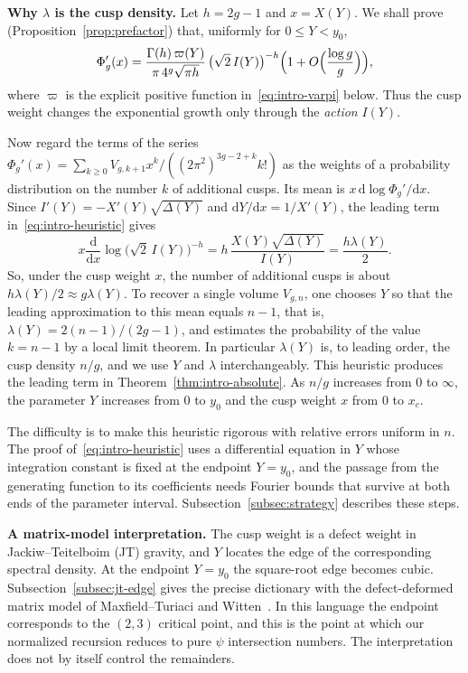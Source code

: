 \textbf{Why $\lambda$ is the cusp density.} Let $h=2g-1$ and $x=X(Y)$. We shall prove (Proposition~\ref{prop:prefactor}) that, uniformly for $0\le Y<y_0$,
\begin{equation}
 \Phi_g'(x)=\frac{\Gamma(h)\,\varpi(Y)}{\pi\,4^g\sqrt{\pi h}}\,
 \bigl(\sqrt2\,I(Y)\bigr)^{-h}\Bigl(1+O\Bigl(\frac{\log g}{g}\Bigr)\Bigr),
 \label{eq:intro-heuristic}
\end{equation}
where $\varpi$ is the explicit positive function in~\eqref{eq:intro-varpi} below. Thus the cusp weight changes the exponential growth only through the \emph{action} $I(Y)$.

Now regard the terms of the series
$\Phi_g'(x)=\sum_{k\ge0}V_{g,k+1}x^k/((2\pi^2)^{3g-2+k}k!)$ as the weights of a
probability distribution on the number $k$ of additional cusps. Its mean is
$x\,\mathrm d\log\Phi_g'/\mathrm dx$. Since $I'(Y)=-X'(Y)\sqrt{\Delta(Y)}$ and
$\mathrm dY/\mathrm dx=1/X'(Y)$, the leading term in~\eqref{eq:intro-heuristic} gives
\[
 x\frac{\mathrm d}{\mathrm dx}\log\bigl(\sqrt2\,I(Y)\bigr)^{-h}
 =h\,\frac{X(Y)\sqrt{\Delta(Y)}}{I(Y)}=\frac{h\lambda(Y)}2 .
\]
So, under the cusp weight $x$, the number of additional cusps is about
$h\lambda(Y)/2\approx g\lambda(Y)$. To recover a single volume $V_{g,n}$, one
chooses $Y$ so that the leading approximation to this mean equals $n-1$, that is,
$\lambda(Y)=2(n-1)/(2g-1)$, and estimates the probability of the value
$k=n-1$ by a local limit theorem. In particular $\lambda(Y)$ is, to leading
order, the cusp density $n/g$, and we use $Y$ and $\lambda$
interchangeably. This heuristic produces the leading term in
Theorem~\ref{thm:intro-absolute}. As $n/g$ increases from $0$ to $\infty$,
the parameter $Y$ increases from $0$ to $y_0$ and the cusp weight $x$ from
$0$ to $x_c$.

The difficulty is to make this heuristic rigorous with relative errors uniform in $n$. The proof of~\eqref{eq:intro-heuristic} uses a differential equation in $Y$ whose integration constant is fixed at the endpoint $Y=y_0$, and the passage from the generating function to its coefficients needs Fourier bounds that survive at both ends of the parameter interval. Subsection~\ref{subsec:strategy} describes these steps.

\textbf{A matrix-model interpretation.} The cusp weight is a defect weight in Jackiw--Teitelboim (JT) gravity, and $Y$ locates the edge of the corresponding spectral density. At the endpoint $Y=y_0$ the square-root edge becomes cubic. Subsection~\ref{subsec:jt-edge} gives the precise dictionary with the defect-deformed matrix model of Maxfield--Turiaci and Witten~\cite{MT,WittenDef,ET}. In this language the endpoint corresponds to the $(2,3)$ critical point, and this is the point at which our normalized recursion reduces to pure $\psi$ intersection numbers. The interpretation does not by itself control the remainders.

